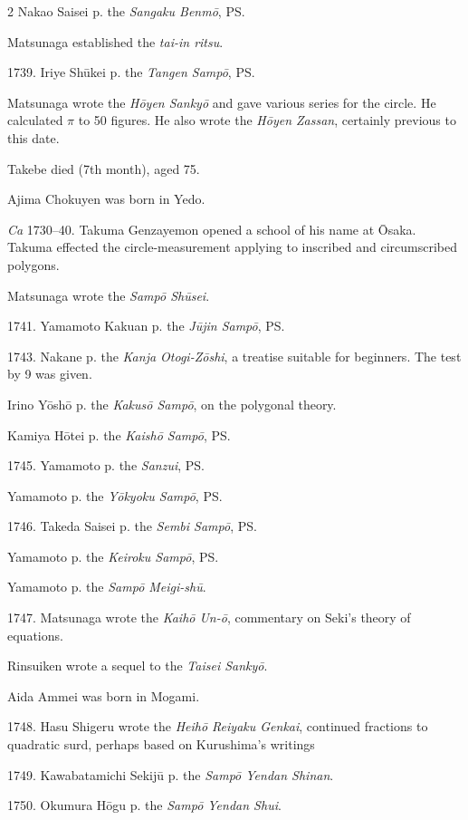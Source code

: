 \documentclass[11pt]{article}
\newcommand{\scanfooter}{}
\begin{document}
\begin{multicols}{2}
Nakao Saisei p. the \emph{Sangaku Benmō}, PS.

Matsunaga established the \emph{tai-in ritsu}.

1739. Iriye Shūkei p. the \emph{Tangen Sampō}, PS.

Matsunaga wrote the \emph{Hōyen Sankyō} and gave various series for the circle. He calculated $\pi$ to 50 figures. He also wrote the \emph{Hōyen Zassan}, certainly previous to this date.

Takebe died (7th month), aged 75.

Ajima Chokuyen was born in Yedo.

\emph{Ca} 1730--40. Takuma Genzayemon opened a school of his name at Ōsaka. Takuma effected the circle-measurement applying to inscribed and circumscribed polygons.

Matsunaga wrote the \emph{Sampō Shūsei}.

1741. Yamamoto Kakuan p. the \emph{Jūjin Sampō}, PS.

1743. Nakane p. the \emph{Kanja Otogi-Zōshi}, a treatise suitable for beginners. The test by 9 was given.

Irino Yōshō p. the \emph{Kakusō Sampō}, on the polygonal theory.

Kamiya Hōtei p. the \emph{Kaishō Sampō}, PS.

1745. Yamamoto p. the \emph{Sanzui}, PS.

Yamamoto p. the \emph{Yōkyoku Sampō}, PS.

1746. Takeda Saisei p. the \emph{Sembi Sampō}, PS.

Yamamoto p. the \emph{Keiroku Sampō}, PS.

Yamamoto p. the \emph{Sampō Meigi-shū}.

1747. Matsunaga wrote the \emph{Kaihō Un-ō}, commentary on Seki's theory of equations.

Rinsuiken wrote a sequel to the \emph{Taisei Sankyō}.

Aida Ammei was born in Mogami.

1748. Hasu Shigeru wrote the \emph{Heihō Reiyaku Genkai}, continued fractions to quadratic surd, perhaps based on Kurushima's writings

1749. Kawabatamichi Sekijū p. the \emph{Sampō Yendan Shinan}.

1750. Okumura Hōgu p. the \emph{Sampō Yendan Shui}.
\end{multicols}
\scanfooter
\end{document}

